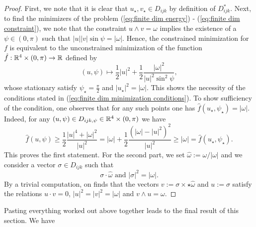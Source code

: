 \begin{proof}
First, we note that it is clear that $u_{\star}, v_{\star} \in D_{ijk}$ by definition of $D_{ijk}^{*}$.
Next, to find the minimizers of the problem (\ref{eq:finite dim energy}) - (\ref{eq:finite dim constraint}), we note that the constraint $u \wedge v = \omega$ implies the existence of a $\psi \in (0, \pi)$ such that $|u||v| \sin \psi= |\omega|$. Hence, the constrained minimization for $f$ is equivalent to the unconstrained minimization of the function $\hat{f}: \mathbb{R}^4 \times (0, \pi) \to \mathbb{R}$ defined by
\begin{equation}
(u, \psi) \mapsto \frac{1}{2} |u|^2 + \frac{1}{2} \frac{|\omega|^2}{|u|^2 \sin^2\psi},
\end{equation}
whose stationary satisfy $\psi_{\star} = \frac{\pi}{2}$ and $|u_{\star}|^2 = |\omega|$. This shows the necessity of the conditions stated in (\ref{eq:finite dim minimization conditions}). To show sufficiency of the condition, one observes that for any such points one has $\hat{f}(u_{\star}, \psi_{\star}) = |\omega|$. Indeed, for any $(u, \psi) \in D_{ijk, \psi} \in \mathbb{R}^4 \times (0, \pi)$ we have
\begin{equation}
\hat{f}(u, \psi) \geq \frac{1}{2} \frac{|u|^4 + |\omega|^2}{|u|^2} = |\omega| + \frac{1}{2}\frac{(|\omega| - |u|^2)^2}{|u|^2} \geq |\omega| = \hat{f}(u_{\star}, \psi_{\star}).
\end{equation}
This proves the first statement. For the second part, we set $\hat{\omega} := \omega/|\omega|$ and we consider a vector $\sigma \in D_{ijk}$ such that
\begin{equation}
	\sigma \cdot \hat{\omega} \text{ and } |\sigma|^2 = |\omega|. 
\end{equation}
By a trivial computation, on finds that the vectors $v := \sigma \times \star \hat{\omega}$ and $u := \sigma$ satisfy the relations $u \cdot v = 0$, $|u|^2 = |v|^2 = |\omega|$ and $v \wedge u = \omega$. 
\end{proof}

Pasting everything worked out above together leads to the final result of this section. We have


